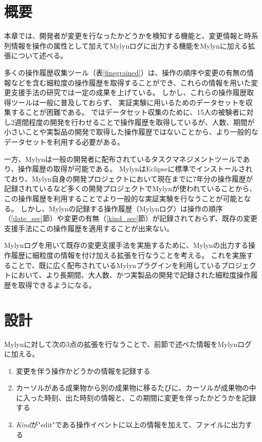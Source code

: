 \documentclass[a4paper]{jsbook}
\begin{document}
\section{概要}
本章では、開発者が変更を行なったかどうかを検知する機能と、変更情報と時系列情報を操作の属性として加えてMylynログに出力する機能をMylynに加える拡張について述べる。

多くの操作履歴収集ツール（表\ref{finegrained}）は、操作の順序や変更の有無の情報などを含む細粒度の操作履歴を取得することができ、これらの情報を用いた変更支援手法の研究では一定の成果を上げている。
しかし、これらの操作履歴取得ツールは一般に普及しておらず、
実証実験に用いるためのデータセットを収集することが困難である。
\cite{6233415,KatoJapanese:2011,ss2012-76,ss2013-84,Yamamori:2016}ではデータセット収集のために、15人の被験者に対し2週間程度の開発を行わせることで操作履歴を取得しているが、人数、期間が小さいことや実製品の開発で取得した操作履歴ではないことから、より一般的なデータセットを利用する必要がある。

一方、Mylyn\cite{Kersten:2005}は一般の開発者に配布されているタスクマネジメントツールであり、操作履歴の取得が可能である。
MylynはEclipseに標準でインストールされており、Mylyn自身の開発プロジェクトにおいて現在までに7年分の操作履歴が記録されているなど多くの開発プロジェクトでMylynが使われていることから、この操作履歴を利用することでより一般的な実証実験を行なうことが可能となる。
しかし、Mylynの記録する操作履歴（Mylynログ）は操作の順序（\ref{date_sec}節）や変更の有無（\ref{kind_sec}節）が記録されておらず、既存の変更支援手法にこの操作履歴を適用することが出来ない。

Mylynログを用いて既存の変更支援手法を実施するために、Mylynの出力する操作履歴に細粒度の情報を付け加える拡張を行なうことを考える。
これを実施することで、既に広く配布されているMylynプラグインを利用しているプロジェクトにおいて、より長期間、大人数、かつ実製品の開発で記録された細粒度操作履歴を取得できるようになる。

\section{設計}
Mylynに対して次の3点の拡張を行なうことで、前節で述べた情報をMylynログに加える。
\begin{enumerate}
  \item 変更を伴う操作かどうかの情報を記録する
  \item カーソルがある成果物から別の成果物に移るたびに、カーソルが成果物の中に入った時刻、出た時刻の情報と、この期間に変更を伴ったかどうかを記録する
  \item {\it Kind}が"edit"である操作イベントに以上の情報を加えて、ファイルに出力する
\end{enumerate}
\end{document}
